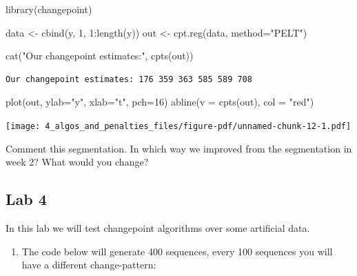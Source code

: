 \documentclass[
  letterpaper,
  DIV=11,
  numbers=noendperiod]{scrreprt}
\newenvironment{Shaded}{\begin{snugshade}}{\end{snugshade}}
\newcommand{\AttributeTok}[1]{\textcolor[rgb]{0.40,0.45,0.13}{#1}}
\newcommand{\DecValTok}[1]{\textcolor[rgb]{0.68,0.00,0.00}{#1}}
\newcommand{\FunctionTok}[1]{\textcolor[rgb]{0.28,0.35,0.67}{#1}}
\newcommand{\NormalTok}[1]{\textcolor[rgb]{0.00,0.23,0.31}{#1}}
\newcommand{\OtherTok}[1]{\textcolor[rgb]{0.00,0.23,0.31}{#1}}
\newcommand{\SpecialCharTok}[1]{\textcolor[rgb]{0.37,0.37,0.37}{#1}}
\newcommand{\StringTok}[1]{\textcolor[rgb]{0.13,0.47,0.30}{#1}}
\providecommand{\tightlist}{%
  \setlength{\itemsep}{0pt}\setlength{\parskip}{0pt}}\usepackage{longtable,booktabs,array}
\begin{document}
\begin{Shaded}
\begin{Highlighting}[]
\FunctionTok{library}\NormalTok{(changepoint)}

\NormalTok{data }\OtherTok{\textless{}{-}} \FunctionTok{cbind}\NormalTok{(y, }\DecValTok{1}\NormalTok{, }\DecValTok{1}\SpecialCharTok{:}\FunctionTok{length}\NormalTok{(y))}
\NormalTok{out }\OtherTok{\textless{}{-}} \FunctionTok{cpt.reg}\NormalTok{(data, }\AttributeTok{method=}\StringTok{"PELT"}\NormalTok{)}

\FunctionTok{cat}\NormalTok{(}\StringTok{"Our changepoint estimates:"}\NormalTok{, }\FunctionTok{cpts}\NormalTok{(out))}
\end{Highlighting}
\end{Shaded}

\begin{verbatim}
Our changepoint estimates: 176 359 363 585 589 708
\end{verbatim}

\begin{Shaded}
\begin{Highlighting}[]
\FunctionTok{plot}\NormalTok{(out, }\AttributeTok{ylab=}\StringTok{"y"}\NormalTok{, }\AttributeTok{xlab=}\StringTok{"t"}\NormalTok{, }\AttributeTok{pch=}\DecValTok{16}\NormalTok{)}
\FunctionTok{abline}\NormalTok{(}\AttributeTok{v =} \FunctionTok{cpts}\NormalTok{(out), }\AttributeTok{col =} \StringTok{"red"}\NormalTok{)}
\end{Highlighting}
\end{Shaded}

\texttt{[image: 4\_algos\_and\_penalties\_files/figure-pdf/unnamed-chunk-12-1.pdf]}

Comment this segmentation. In which way we improved from the
segmentation in week 2? What would you change?

\subsection{Lab 4}\label{lab-4}

In this lab we will test changepoint algorithms over some artificial
data.

\begin{enumerate}
\def\labelenumi{\arabic{enumi}.}
\tightlist
\item
  The code below will generate 400 sequences, every 100 sequences you
  will have a different change-pattern:
\end{enumerate}
\end{document}
